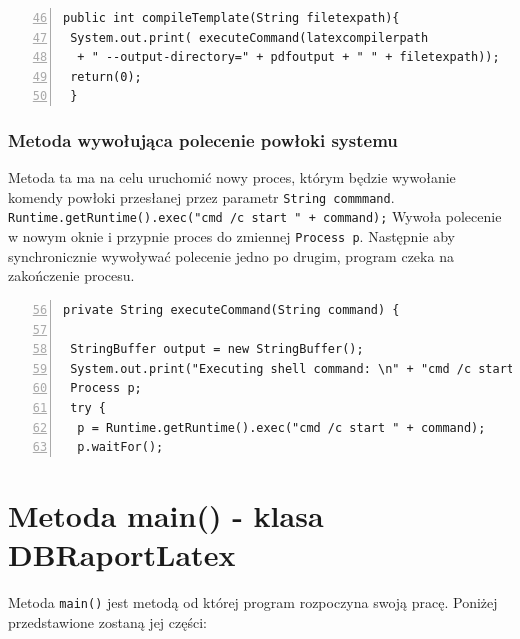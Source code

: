  \begin{lstlisting}[numbers=left,firstnumber=46]
public int compileTemplate(String filetexpath){
 System.out.print( executeCommand(latexcompilerpath
  + " --output-directory=" + pdfoutput + " " + filetexpath));
 return(0);
 }
\end{lstlisting}

\subsubsection*{Metoda wywołująca polecenie powłoki systemu}


Metoda ta ma na celu uruchomić nowy proces, którym będzie wywołanie komendy powłoki przesłanej przez parametr \texttt{String commmand}. \texttt{Runtime.getRuntime().exec("cmd /c start " + command);} Wywoła polecenie w nowym oknie i przypnie proces do zmiennej \texttt{Process p}. Następnie aby synchronicznie wywoływać polecenie jedno po drugim, program czeka na zakończenie procesu. 

 \begin{lstlisting}[numbers=left,firstnumber=56]
private String executeCommand(String command) {
 
 StringBuffer output = new StringBuffer();
 System.out.print("Executing shell command: \n" + "cmd /c start " + command);
 Process p;
 try {
  p = Runtime.getRuntime().exec("cmd /c start " + command);
  p.waitFor();

\end{lstlisting}

\section{Metoda main() - klasa DBRaportLatex }

Metoda \texttt{main()} jest metodą od której program rozpoczyna swoją pracę. Poniżej przedstawione zostaną jej części:

